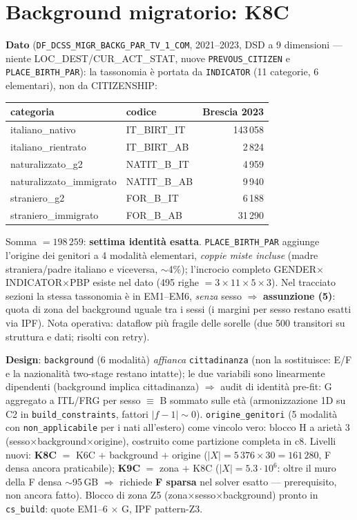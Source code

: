 \documentclass[11pt,a4paper]{article}
\newcommand{\code}[1]{\texttt{#1}}
\newcommand{\flow}[1]{\texttt{\small #1}}
\begin{document}
\section{Background migratorio: K8C}
\label{sec:k8c}
\textbf{Dato} (\flow{DF\_DCSS\_MIGR\_BACKG\_PAR\_TV\_1\_COM}, 2021--2023,
DSD a 9 dimensioni --- niente LOC\_DEST/CUR\_ACT\_STAT, nuove
\code{PREVOUS\_CITIZEN} e \code{PLACE\_BIRTH\_PAR}): la tassonomia \`e
portata da \code{INDICATOR} (11 categorie, 6 elementari), non da
CITIZENSHIP:
\begin{center}\small
\begin{tabular}{@{}llr@{}}
\toprule
\textbf{categoria} & \textbf{codice} & \textbf{Brescia 2023}\\
\midrule
italiano\_nativo & IT\_BIRT\_IT & 143\,058\\
italiano\_rientrato & IT\_BIRT\_AB & 2\,824\\
naturalizzato\_g2 & NATIT\_B\_IT & 4\,959\\
naturalizzato\_immigrato & NATIT\_B\_AB & 9\,940\\
straniero\_g2 & FOR\_B\_IT & 6\,188\\
straniero\_immigrato & FOR\_B\_AB & 31\,290\\
\bottomrule
\end{tabular}
\end{center}
Somma $= 198\,259$: \textbf{settima identit\`a esatta}. \code{PLACE\_BIRTH\_PAR}
aggiunge l'origine dei genitori a 4 modalit\`a elementari, \emph{coppie miste
incluse} (madre straniera/padre italiano e viceversa, $\sim$4\%); l'incrocio
completo GENDER$\times$INDICATOR$\times$PBP esiste nel dato (495 righe $=
3\times11\times5\times3$). Nel tracciato sezioni la stessa tassonomia \`e in
EM1--EM6, \emph{senza} sesso $\Rightarrow$ \textbf{assunzione (5)}: quota di
zona del background uguale tra i sessi (i margini per sesso restano esatti
via IPF). Nota operativa: dataflow pi\`u fragile delle sorelle (due 500
transitori su struttura e dati; risolti con retry).

\medskip\noindent\textbf{Design}: \code{background} (6 modalit\`a)
\emph{affianca} \code{cittadinanza} (non la sostituisce: E/F e la
nazionalit\`a two-stage restano intatte); le due variabili sono linearmente
dipendenti (background implica cittadinanza) $\Rightarrow$ audit di identit\`a
pre-fit: G aggregato a ITL/FRG per sesso $\equiv$ B sommato sulle et\`a
(armonizzazione 1D su C2 in \code{build\_constraints}, fattori $|f-1|\sim0$).
\code{origine\_genitori} (5 modalit\`a con \code{non\_applicabile} per i nati
all'estero) come vincolo vero: blocco H a ariet\`a 3
(sesso$\times$background$\times$origine), costruito come partizione completa
in c8. Livelli nuovi: \textbf{K8C} $=$ K6C $+$ background $+$ origine
($|X| = 5\,376\times30 = 161\,280$, F densa ancora praticabile);
\textbf{K9C} $=$ zona $+$ K8C ($|X| = 5.3\cdot10^6$: oltre il muro della F
densa $\sim$95\,GB $\Rightarrow$ richiede \textbf{F sparsa} nel solver
esatto --- prerequisito, non ancora fatto). Blocco di zona Z5
(zona$\times$sesso$\times$background) pronto in \code{cs\_build}: quote
EM1--6 $\times$ G, IPF pattern-Z3.
\end{document}
